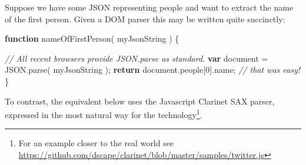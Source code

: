 \documentclass[12pt, ]{article}
\newenvironment{Shaded}{}{}
\newcommand{\KeywordTok}[1]{\textcolor[rgb]{0.00,0.44,0.13}{\textbf{{#1}}}}
\newcommand{\DecValTok}[1]{\textcolor[rgb]{0.25,0.63,0.44}{{#1}}}
\newcommand{\CommentTok}[1]{\textcolor[rgb]{0.38,0.63,0.69}{\textit{{#1}}}}
\newcommand{\OtherTok}[1]{\textcolor[rgb]{0.00,0.44,0.13}{{#1}}}
\newcommand{\FunctionTok}[1]{\textcolor[rgb]{0.02,0.16,0.49}{{#1}}}
\newcommand{\NormalTok}[1]{{#1}}
\begin{document}
Suppose we have some JSON representing people and want to extract the
name of the first person. Given a DOM parser this may be written quite
succinctly:

\begin{Shaded}
\begin{Highlighting}[]
\KeywordTok{function} \FunctionTok{nameOfFirstPerson}\NormalTok{( myJsonString ) \{}

   \CommentTok{// All recent browsers provide JSON.parse as standard. }
   \KeywordTok{var} \NormalTok{document = }\OtherTok{JSON}\NormalTok{.}\FunctionTok{parse}\NormalTok{( myJsonString );}
   \KeywordTok{return} \OtherTok{document}\NormalTok{.}\FunctionTok{people}\NormalTok{[}\DecValTok{0}\NormalTok{].}\FunctionTok{name}\NormalTok{; }\CommentTok{// that was easy!}
\NormalTok{\}}
\end{Highlighting}
\end{Shaded}

To contrast, the equivalent below uses the Javascript Clarinet SAX
parser, expressed in the most natural way for the technology\footnote{For
  an example closer to the real world see
  \url{https://github.com/dscape/clarinet/blob/master/samples/twitter.js}}.
\end{document}
